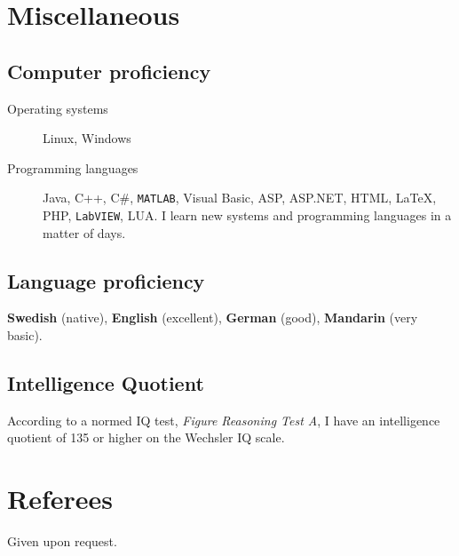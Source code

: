 \section*{Miscellaneous}
\subsection*{Computer proficiency}
\begin{description}
\item[Operating systems] Linux, Windows
\item[Programming languages] Java, C++, C\#, \verb+MATLAB+, Visual Basic, ASP, ASP.NET, HTML, \LaTeX, PHP, \verb+LabVIEW+, LUA. I learn new systems and programming languages in a matter of days.
\end{description}
\vspace{-0.1in}

\subsection*{Language proficiency}
\textbf{Swedish} (native), \textbf{English} (excellent), \textbf{German} (good), \textbf{Mandarin} (very basic).

\subsection*{Intelligence Quotient}
According to a normed IQ test, \emph{Figure Reasoning Test A}, I have an intelligence quotient of 135 or higher on the Wechsler IQ scale.

\section*{Referees}
Given upon request.

